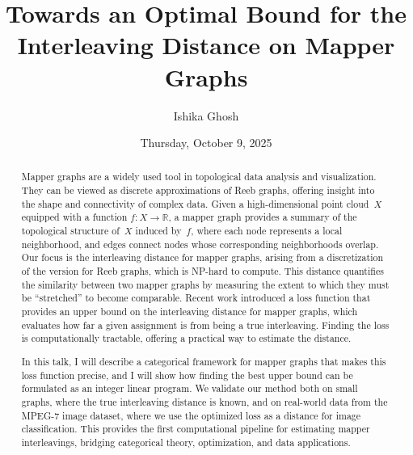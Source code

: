 \documentclass{UAmathtalk}
\author{Ishika Ghosh}
\title{Towards an Optimal Bound for the Interleaving Distance on Mapper Graphs}
\date{Thursday, October 9, 2025}
\begin{document}
\maketitle

\begin{abstract}
Mapper graphs are a widely used tool in topological data analysis and visualization. They can be viewed as discrete approximations of Reeb graphs, offering insight into the shape and connectivity of complex data. Given a high-dimensional point cloud~$X$ equipped with a function $f\colon X \to \mathbb{R}$, a mapper graph provides a summary of the topological structure of~$X$ induced by~$f$, where each node represents a local neighborhood, and edges connect nodes whose corresponding neighborhoods overlap. Our focus is the interleaving distance for mapper graphs, arising from a discretization of the version for Reeb graphs, which is NP-hard to compute. This distance quantifies the similarity between two mapper graphs by measuring the extent to which they must be ``stretched'' to become comparable. Recent work introduced a loss function that provides an upper bound on the interleaving distance for mapper graphs, which evaluates how far a given assignment is from being a true interleaving. Finding the loss is computationally tractable, offering a practical way to estimate the distance.

In this talk, I will describe a categorical framework for mapper graphs that makes this loss function precise, and I will show how finding the best upper bound can be formulated as an integer linear program. We validate our method both on small graphs, where the true interleaving distance is known, and on real-world data from the MPEG-7 image dataset, where we use the optimized loss as a distance for image classification. This provides the first computational pipeline for estimating mapper interleavings, bridging categorical theory, optimization, and data applications.
\end{abstract}
\end{document}
